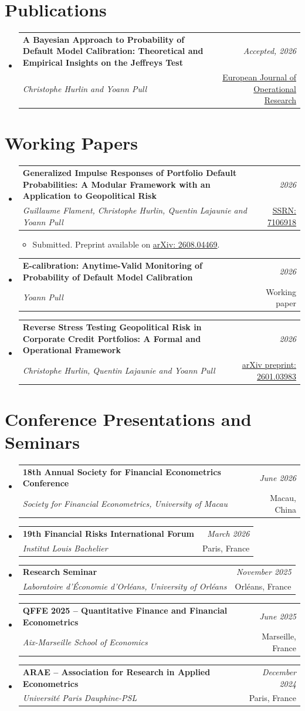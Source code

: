 \documentclass[a4paper,11pt]{article}
\newcommand{\resumeProject}[4]{
\vspace{0.5mm}\item
    \begin{tabularx}{0.98\textwidth}[t]{X r}
        \textbf{#1} & \textit{\footnotesize{#3}} \\
        \footnotesize{\textit{#2}} & \footnotesize{#4}
    \end{tabularx}
    \vspace{-2.4mm}
}
\newcommand{\resumeSubHeadingListStart}{\begin{itemize}[leftmargin=*,labelsep=1mm]}
\newcommand{\resumeItemListStart}{\begin{itemize}[leftmargin=*,labelsep=1mm,itemsep=0.5mm]\small}
\newcommand{\resumeSubHeadingListEnd}{\end{itemize}\vspace{2mm}}
\newcommand{\resumeItemListEnd}{\end{itemize}\vspace{-2mm}}
\begin{document}
\section{\textbf{Publications}}
\vspace{-0.4mm}
\resumeSubHeadingListStart
\resumeProject
  {A Bayesian Approach to Probability of Default Model Calibration: Theoretical and Empirical Insights on the Jeffreys Test}
  {Christophe Hurlin and Yoann Pull}
  {Accepted, 2026}
  {\href{https://www.sciencedirect.com/science/article/abs/pii/S0377221726004509}{European Journal of Operational Research}}
\resumeSubHeadingListEnd
\vspace{-6mm}
\section{\textbf{Working Papers}}
\vspace{-0.4mm}
\resumeSubHeadingListStart
\resumeProject
  {Generalized Impulse Responses of Portfolio Default Probabilities: A Modular Framework with an Application to Geopolitical Risk}
  {Guillaume Flament, Christophe Hurlin, Quentin Lajaunie and Yoann Pull}
  {2026}
  {\href{https://papers.ssrn.com/sol3/papers.cfm?abstract_id=7106918}{SSRN: 7106918}}
\resumeItemListStart
\item Submitted. Preprint available on \href{https://arxiv.org/abs/2608.04469}{arXiv: 2608.04469}.
\resumeItemListEnd
\resumeProject
  {E-calibration: Anytime-Valid Monitoring of Probability of Default Model Calibration}
  {Yoann Pull}
  {2026}
  {Working paper}
\resumeProject
  {Reverse Stress Testing Geopolitical Risk in Corporate Credit Portfolios: A Formal and Operational Framework}
  {Christophe Hurlin, Quentin Lajaunie and Yoann Pull}
  {2026}
  {\href{https://arxiv.org/abs/2601.03983}{arXiv preprint: 2601.03983}}
\resumeSubHeadingListEnd
\vspace{-6mm}
\section{\textbf{Conference Presentations and Seminars}}
\vspace{-0.4mm}
\resumeSubHeadingListStart
\resumeProject
  {18th Annual Society for Financial Econometrics Conference}
  {Society for Financial Econometrics, University of Macau}
  {June 2026}
  {Macau, China}
\resumeProject
  {19th Financial Risks International Forum}
  {Institut Louis Bachelier}
  {March 2026}
  {Paris, France}
\resumeProject
  {Research Seminar}
  {Laboratoire d'Économie d'Orléans, University of Orléans}
  {November 2025}
  {Orléans, France}
\resumeProject
  {QFFE 2025 -- Quantitative Finance and Financial Econometrics}
  {Aix-Marseille School of Economics}
  {June 2025}
  {Marseille, France}
\resumeProject
  {ARAE -- Association for Research in Applied Econometrics}
  {Université Paris Dauphine-PSL}
  {December 2024}
  {Paris, France}
\resumeSubHeadingListEnd
\vspace{-6mm}
\end{document}
